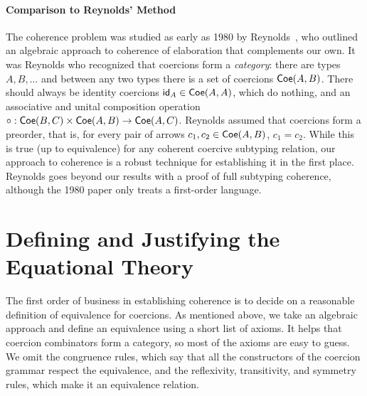 \documentclass[acmsmall,screen]{acmart}
\begin{document}
\paragraph{Comparison to Reynolds' Method}
The coherence problem was studied as early as 1980 by
Reynolds~\cite{reynolds80}, who outlined an algebraic approach to coherence of
elaboration that complements our own. It was Reynolds who recognized that
coercions form a \emph{category}: there are types \(A, B, \dots\) and between
any two types there is a set of coercions \(\mathsf{Coe}(A, B)\). There should always be
identity coercions \(\mathsf{id}_A \in \mathsf{Coe}(A, A)\), which do nothing, and an
associative and unital composition operation
\(\circ : \mathsf{Coe}(B, C) \times \mathsf{Coe}(A, B) \to \mathsf{Coe}(A, C)\).
Reynolds assumed that coercions form a preorder, that is, for every pair of
arrows \(c_1, c_2 \in \mathsf{Coe}(A, B)\), \(c_1 = c_2\). While this is true (up to
equivalence) for any coherent coercive subtyping relation,
our approach to coherence is a robust technique for establishing it in the first
place. Reynolds goes beyond our results with a proof of full subtyping
coherence, although the 1980 paper only treats a first-order language.


\section{Defining and Justifying the Equational Theory}
The first order of business in establishing coherence is to decide on a
reasonable definition of equivalence for coercions. As mentioned above, we take
an algebraic approach and define an equivalence using a short list of axioms.
It helps that coercion combinators form a category, so most of the axioms are
easy to guess. We omit the congruence rules, which say that all the
constructors of the coercion grammar respect the equivalence, and the
reflexivity, transitivity, and symmetry rules, which make it an equivalence relation.
\end{document}
